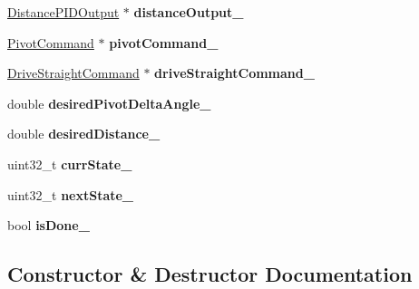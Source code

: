 \begin{DoxyCompactItemize}
\hyperlink{class_distance_p_i_d_output}{Distance\+P\+I\+D\+Output} $\ast$ {\bfseries distance\+Output\+\_\+}
\item 
\mbox{\label{class_align_with_peg_command_a1b6119efd05f41b8b06465562b72a987}} 
\hyperlink{class_pivot_command}{Pivot\+Command} $\ast$ {\bfseries pivot\+Command\+\_\+}
\item 
\mbox{\label{class_align_with_peg_command_a7f524185d4c315ca8bf7ea309c4e1478}} 
\hyperlink{class_drive_straight_command}{Drive\+Straight\+Command} $\ast$ {\bfseries drive\+Straight\+Command\+\_\+}
\item 
\mbox{\label{class_align_with_peg_command_ae6ec91ed94010fafd48ecdf2f26b1e81}} 
double {\bfseries desired\+Pivot\+Delta\+Angle\+\_\+}
\item 
\mbox{\label{class_align_with_peg_command_a51dff5fc1c0f3e932e882f3f36c448cb}} 
double {\bfseries desired\+Distance\+\_\+}
\item 
\mbox{\label{class_align_with_peg_command_a5d65a2e3cb24992c069f406425ab769c}} 
uint32\+\_\+t {\bfseries curr\+State\+\_\+}
\item 
\mbox{\label{class_align_with_peg_command_ad74098a143c21fc3ad767661e15add1e}} 
uint32\+\_\+t {\bfseries next\+State\+\_\+}
\item 
\mbox{\label{class_align_with_peg_command_a99596205fd983a9a2818e85696abc6b6}} 
bool {\bfseries is\+Done\+\_\+}
\end{DoxyCompactItemize}


\subsection{Constructor \& Destructor Documentation}
\mbox{\label{class_align_with_peg_command_aa80f810ce5619a36edaef95cc29c9323}} 
